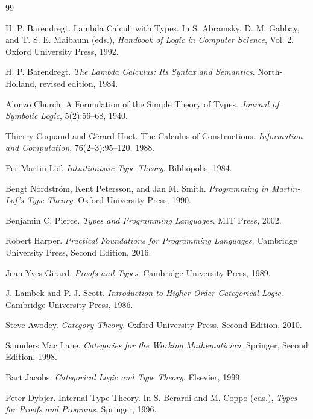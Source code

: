\documentclass[12pt,oneside]{article}
\theoremstyle{definition}
\theoremstyle{remark}
\begin{document}
\begin{thebibliography}{99}

H. P. Barendregt.
\newblock Lambda Calculi with Types.
\newblock In S. Abramsky, D. M. Gabbay, and T. S. E. Maibaum (eds.),
\emph{Handbook of Logic in Computer Science}, Vol. 2.
Oxford University Press, 1992.

H. P. Barendregt.
\newblock \emph{The Lambda Calculus: Its Syntax and Semantics}.
\newblock North-Holland, revised edition, 1984.

Alonzo Church.
\newblock A Formulation of the Simple Theory of Types.
\newblock \emph{Journal of Symbolic Logic}, 5(2):56--68, 1940.

Thierry Coquand and Gérard Huet.
\newblock The Calculus of Constructions.
\newblock \emph{Information and Computation}, 76(2--3):95--120, 1988.

Per Martin-Löf.
\newblock \emph{Intuitionistic Type Theory}.
\newblock Bibliopolis, 1984.

Bengt Nordström, Kent Petersson, and Jan M. Smith.
\newblock \emph{Programming in Martin-Löf's Type Theory}.
\newblock Oxford University Press, 1990.

Benjamin C. Pierce.
\newblock \emph{Types and Programming Languages}.
\newblock MIT Press, 2002.

Robert Harper.
\newblock \emph{Practical Foundations for Programming Languages}.
\newblock Cambridge University Press, Second Edition, 2016.

Jean-Yves Girard.
\newblock \emph{Proofs and Types}.
\newblock Cambridge University Press, 1989.

J. Lambek and P. J. Scott.
\newblock \emph{Introduction to Higher-Order Categorical Logic}.
\newblock Cambridge University Press, 1986.

Steve Awodey.
\newblock \emph{Category Theory}.
\newblock Oxford University Press, Second Edition, 2010.

Saunders Mac Lane.
\newblock \emph{Categories for the Working Mathematician}.
\newblock Springer, Second Edition, 1998.

Bart Jacobs.
\newblock \emph{Categorical Logic and Type Theory}.
\newblock Elsevier, 1999.

Peter Dybjer.
\newblock Internal Type Theory.
\newblock In S. Berardi and M. Coppo (eds.),
\emph{Types for Proofs and Programs}.
Springer, 1996.


\end{thebibliography}
\end{document}
